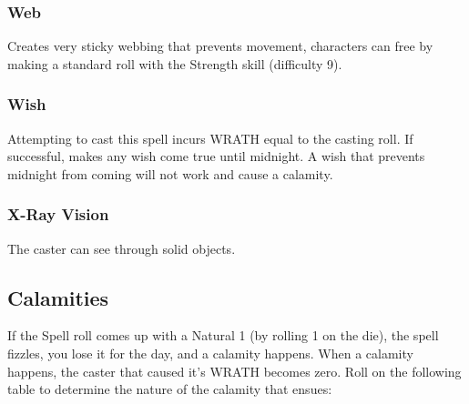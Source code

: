 \begin{multicols}{3}
\subsubsection*{Web}
Creates very sticky webbing that prevents movement, characters can free by making a standard roll with the Strength skill (difficulty 9).
\subsubsection*{Wish}
Attempting to cast this spell incurs WRATH equal to the casting roll. If successful, makes any wish come true until midnight. A wish that prevents midnight from coming will not work and cause a calamity.
\subsubsection*{X-Ray Vision}
The caster can see through solid objects.
\end{multicols}

\subsection{Calamities}
If the Spell roll comes up with a Natural 1 (by rolling 1 on the die), the spell fizzles, you lose it for the day, and a calamity happens. When a calamity happens, the caster that caused it's WRATH becomes zero. Roll on the following table to determine the nature of the calamity that ensues:

